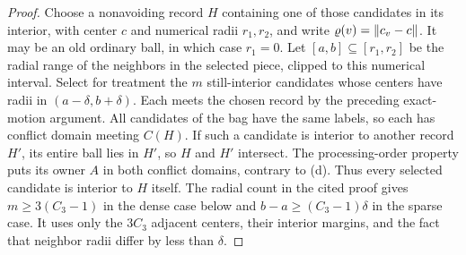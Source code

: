 \begin{proof}
Choose a nonavoiding record $H$ containing one of those candidates
in its interior, with center $c$ and numerical radii $r_1,r_2$,
and write $\varrho(v)=\lVert c_v-c\rVert$.  It may be an old ordinary
ball, in which case $r_1=0$.
Let $[a,b]\subseteq[r_1,r_2]$ be the radial range of the neighbors
in the selected piece, clipped to this numerical interval.  Select for treatment
the $m$ still-interior candidates whose centers have radii in
$(a-\delta,b+\delta)$.  Each meets the chosen record by the preceding
exact-motion argument.  All candidates of the bag have the same
labels, so each has conflict domain meeting $C(H)$.  If such a
candidate is interior to another record $H'$, its entire ball lies
in $H'$, so $H$ and $H'$ intersect.  The processing-order property
puts its owner $A$ in both conflict domains, contrary to (d).
Thus every selected candidate is interior to $H$ itself.
The radial count in the cited proof gives
$m\ge3(C_3-1)$ in the dense case below and
$b-a\ge(C_3-1)\delta$ in the sparse case.  It uses only the
$3C_3$ adjacent centers, their interior margins, and the fact that
neighbor radii differ by less than $\delta$.


\end{proof}
